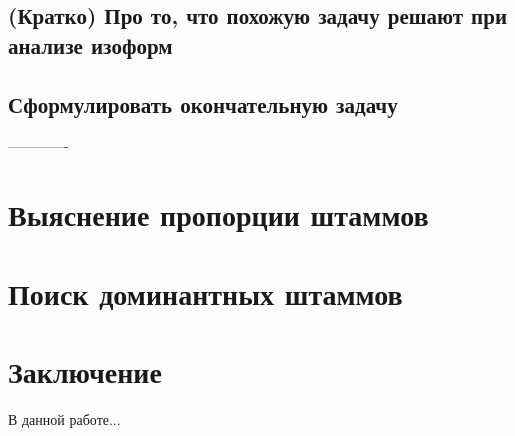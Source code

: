 \documentclass{spbau-diploma}
\begin{document}
\subsection{(Кратко) Про то, что похожую задачу решают при анализе изоформ}

\subsection{Сформулировать окончательную задачу}







-------------














\section{Выяснение пропорции штаммов}
\section{Поиск доминантных штаммов}




\section*{Заключение}
В данной работе...\cite{DESMAN}




\end{document}
